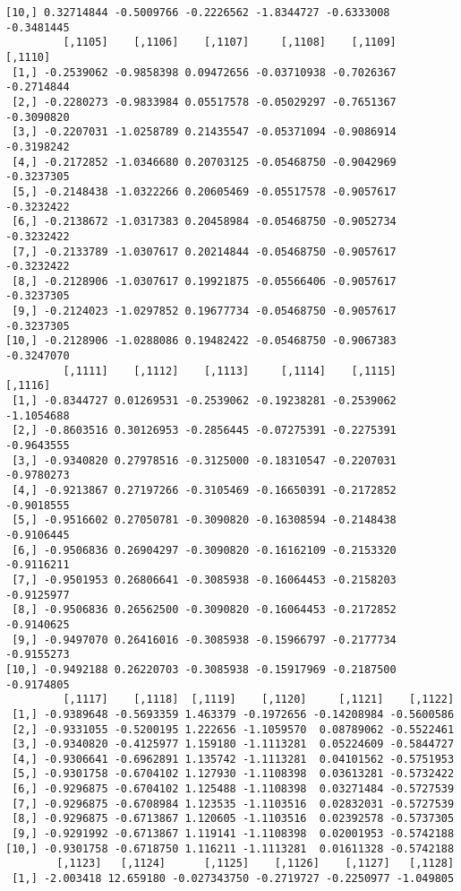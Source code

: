 \documentclass[
  letterpaper,
  DIV=11,
  numbers=noendperiod]{scrreprt}
\begin{document}
\begin{verbatim}
[10,] 0.32714844 -0.5009766 -0.2226562 -1.8344727 -0.6333008 -0.3481445
         [,1105]    [,1106]    [,1107]     [,1108]    [,1109]    [,1110]
 [1,] -0.2539062 -0.9858398 0.09472656 -0.03710938 -0.7026367 -0.2714844
 [2,] -0.2280273 -0.9833984 0.05517578 -0.05029297 -0.7651367 -0.3090820
 [3,] -0.2207031 -1.0258789 0.21435547 -0.05371094 -0.9086914 -0.3198242
 [4,] -0.2172852 -1.0346680 0.20703125 -0.05468750 -0.9042969 -0.3237305
 [5,] -0.2148438 -1.0322266 0.20605469 -0.05517578 -0.9057617 -0.3232422
 [6,] -0.2138672 -1.0317383 0.20458984 -0.05468750 -0.9052734 -0.3232422
 [7,] -0.2133789 -1.0307617 0.20214844 -0.05468750 -0.9057617 -0.3232422
 [8,] -0.2128906 -1.0307617 0.19921875 -0.05566406 -0.9057617 -0.3237305
 [9,] -0.2124023 -1.0297852 0.19677734 -0.05468750 -0.9057617 -0.3237305
[10,] -0.2128906 -1.0288086 0.19482422 -0.05468750 -0.9067383 -0.3247070
         [,1111]    [,1112]    [,1113]     [,1114]    [,1115]    [,1116]
 [1,] -0.8344727 0.01269531 -0.2539062 -0.19238281 -0.2539062 -1.1054688
 [2,] -0.8603516 0.30126953 -0.2856445 -0.07275391 -0.2275391 -0.9643555
 [3,] -0.9340820 0.27978516 -0.3125000 -0.18310547 -0.2207031 -0.9780273
 [4,] -0.9213867 0.27197266 -0.3105469 -0.16650391 -0.2172852 -0.9018555
 [5,] -0.9516602 0.27050781 -0.3090820 -0.16308594 -0.2148438 -0.9106445
 [6,] -0.9506836 0.26904297 -0.3090820 -0.16162109 -0.2153320 -0.9116211
 [7,] -0.9501953 0.26806641 -0.3085938 -0.16064453 -0.2158203 -0.9125977
 [8,] -0.9506836 0.26562500 -0.3090820 -0.16064453 -0.2172852 -0.9140625
 [9,] -0.9497070 0.26416016 -0.3085938 -0.15966797 -0.2177734 -0.9155273
[10,] -0.9492188 0.26220703 -0.3085938 -0.15917969 -0.2187500 -0.9174805
         [,1117]    [,1118]  [,1119]    [,1120]     [,1121]    [,1122]
 [1,] -0.9389648 -0.5693359 1.463379 -0.1972656 -0.14208984 -0.5600586
 [2,] -0.9331055 -0.5200195 1.222656 -1.1059570  0.08789062 -0.5522461
 [3,] -0.9340820 -0.4125977 1.159180 -1.1113281  0.05224609 -0.5844727
 [4,] -0.9306641 -0.6962891 1.135742 -1.1113281  0.04101562 -0.5751953
 [5,] -0.9301758 -0.6704102 1.127930 -1.1108398  0.03613281 -0.5732422
 [6,] -0.9296875 -0.6704102 1.125488 -1.1108398  0.03271484 -0.5727539
 [7,] -0.9296875 -0.6708984 1.123535 -1.1103516  0.02832031 -0.5727539
 [8,] -0.9296875 -0.6713867 1.120605 -1.1103516  0.02392578 -0.5737305
 [9,] -0.9291992 -0.6713867 1.119141 -1.1108398  0.02001953 -0.5742188
[10,] -0.9301758 -0.6718750 1.116211 -1.1113281  0.01611328 -0.5742188
        [,1123]   [,1124]      [,1125]    [,1126]    [,1127]   [,1128]
 [1,] -2.003418 12.659180 -0.027343750 -0.2719727 -0.2250977 -1.049805

\end{verbatim}
\end{document}
